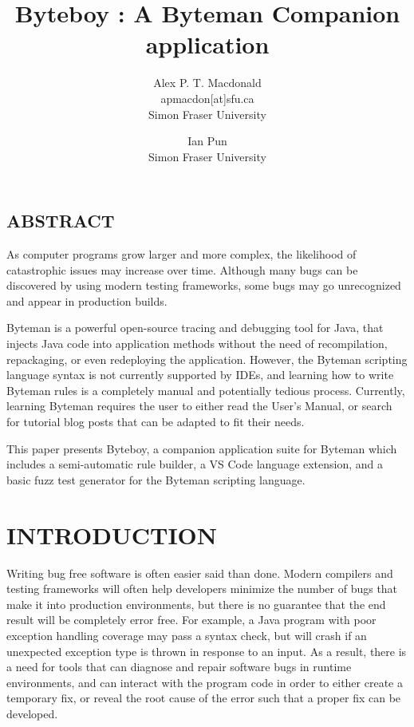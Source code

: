 \documentclass[letterpaper,twocolumn,10pt]{article}
\begin{document}
\date{}

\title{\Large \bf Byteboy : A Byteman Companion application}

\author{
{\rm Alex P. T. Macdonald}\\
apmacdon[at]sfu.ca\\
Simon Fraser University
\and
{\rm Ian Pun}\\
Simon Fraser University
} %

\maketitle

\subsection*{ABSTRACT}
As computer programs grow larger and more complex, the likelihood of catastrophic issues may increase over time. Although many bugs can be discovered by using modern testing frameworks, some bugs may go unrecognized and appear in production builds. 

Byteman is a powerful open-source tracing and debugging tool for Java, that injects Java code into application methods without the need of recompilation, repackaging, or even redeploying the application. However, the Byteman scripting language syntax is not currently supported by IDEs, and learning how to write Byteman rules is a completely manual and potentially tedious process. Currently, learning Byteman requires the user to either read the User's Manual, or search for tutorial blog posts that can be adapted to fit their needs. 

This paper presents Byteboy, a companion application suite for Byteman which includes a semi-automatic rule builder, a VS Code language extension, and a basic fuzz test generator for the Byteman scripting language.  

\section{INTRODUCTION}

Writing bug free software is often easier said than done. Modern compilers and testing frameworks will often help developers minimize the number of bugs that make it into production environments, but there is no guarantee that the end result will be completely error free. For example, a Java program with poor exception handling coverage may pass a syntax check, but will crash if an unexpected exception type is thrown in response to an input. As a result, there is a need for tools that can diagnose and repair software bugs in runtime environments, and can interact with the program code in order to either create a temporary fix, or reveal the root cause of the error such that a proper fix can be developed.
\end{document}
